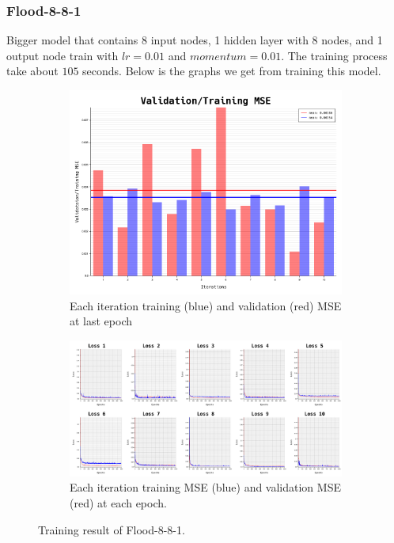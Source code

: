 \documentclass{article}
\begin{document}
\newpage
\subsubsection*{Flood-8-8-1}
Bigger model that contains 8 input nodes, 1 hidden layer with 8 nodes, and 1 output node train with $lr = 0.01$ and $momentum = 0.01$.
The training process take about $105$ seconds.
Below is the graphs we get from training this model. 
\begin{figure}[ht]
	\begin{subfigure}{\textwidth}
		\centering
		\includegraphics[scale=0.3]{flood-8-8-1/cv_l}
		\caption{Each iteration training (blue) and validation (red) MSE at last epoch}
		\label{fig:5a}
	\end{subfigure}
	\begin{subfigure}{\textwidth}
		\includegraphics[width=\textwidth]{flood-8-8-1/loss}
		\caption{Each iteration training MSE (blue) and validation MSE (red) at each epoch.}
		\label{fig:5b}
	\end{subfigure}
	\caption{Training result of Flood-8-8-1.}
	\label{fig:5}
\end{figure}
\FloatBarrier
\end{document}
